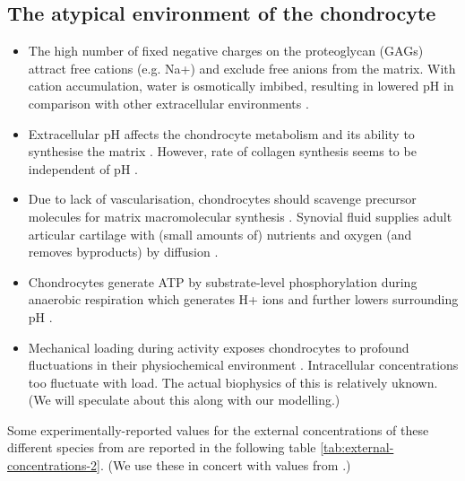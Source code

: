 \subsection*{The atypical environment of the chondrocyte}
\label{sec:chondrocyte-environment}


\begin{itemize}
  \item The high number of fixed negative charges on the proteoglycan
    (GAGs) attract free cations (e.g. Na+) and exclude free anions from
    the matrix. With cation accumulation, water is osmotically imbibed,
    resulting in lowered pH in comparison with other extracellular
    environments \citep{Wilkinsetal2000, LeeUrban1997}.
  \item Extracellular pH affects the chondrocyte metabolism and its
    ability to synthesise the matrix
    \citep{BarrettJolleyetal2010}. However, rate of collagen
    synthesis seems to be independent of pH \citep{Wuetal2007}.
  \item Due to lack of vascularisation, chondrocytes should scavenge
    precursor molecules for matrix macromolecular synthesis
    \citep{Holmetal1998, Stockwell1991}. Synovial fluid supplies adult
    articular cartilage with (small amounts of) nutrients and oxygen
    (and removes byproducts) by diffusion \citep{LeeUrban1997,
      Otte1991}.
  \item Chondrocytes generate ATP by substrate-level phosphorylation
    during anaerobic respiration which generates H+ ions and further
    lowers surrounding pH \citep{LeeUrban1997}.
  \item Mechanical loading during activity exposes chondrocytes to
    profound fluctuations in their physiochemical environment
    \citep{Mowetal1999, Urban1994}.
    Intracellular concentrations too fluctuate with load. The actual
    biophysics of this is relatively uknown. (We will speculate about
    this along with our modelling.)
\end{itemize}

Some experimentally-reported values for the external concentrations of
these different species from are reported in the following table
\ref{tab:external-concentrations-2}. (We use these in concert with
values from \cite{Clarketal2011}.)

